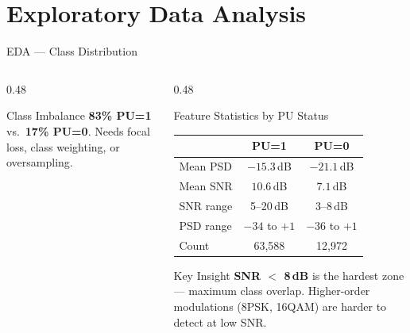 \documentclass[aspectratio=169, 10pt]{beamer}
\begin{document}
\section{Exploratory Data Analysis}
\begin{frame}{EDA --- Class Distribution}
\small
\begin{columns}[T]
\begin{column}{0.48\textwidth}
\begin{center}
\end{center}

\begin{alertblock}{Class Imbalance}
\footnotesize \textbf{83\% PU=1} vs.\ \textbf{17\% PU=0}. Needs focal loss, class weighting, or oversampling.
\end{alertblock}
\end{column}

\begin{column}{0.48\textwidth}
\begin{block}{Feature Statistics by PU Status}
\footnotesize
\renewcommand{\arraystretch}{1.2}
\begin{tabular}{@{}lcc@{}}
\toprule
 & \textbf{PU=1} & \textbf{PU=0} \\
\midrule
Mean PSD   & $-15.3$\,dB & $-21.1$\,dB \\
Mean SNR   & $10.6$\,dB  & $7.1$\,dB \\
SNR range  & 5--20\,dB   & 3--8\,dB \\
PSD range  & $-34$ to $+1$ & $-36$ to $+1$ \\
Count      & 63{,}588 & 12{,}972 \\
\bottomrule
\end{tabular}
\end{block}

\vspace{2pt}

\begin{exampleblock}{Key Insight}
\footnotesize
\textbf{SNR $<$ 8\,dB} is the hardest zone --- maximum class overlap. Higher-order modulations (8PSK, 16QAM) are harder to detect at low SNR.
\end{exampleblock}
\end{column}
\end{columns}
\end{frame}
\end{document}
